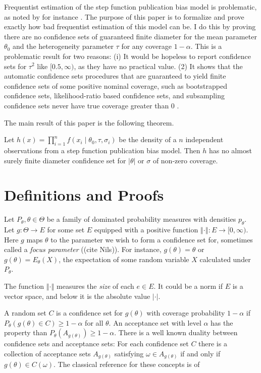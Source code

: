 \documentclass[twoside]{article}
\begin{document}
Frequentist estimation of the step function publication bias model
is problematic, as noted by for instance \citet[appendix, 1]{mcshane2016adjusting}.
The purpose of this paper is to formalize and prove exactly how bad frequentist estimation of this model can be. I do this by proving there are no confidence sets of guaranteed finite diameter for the mean parameter $\theta_{0}$
and the heterogeneity parameter $\tau$ for any coverage $1-\alpha$.
This is a problematic result for two reasons: (i) It would be hopeless
to report confidence sets for $\tau^{2}$ like $[0.5,\infty)$,
as they have no practical value. (2) It shows that the automatic confidence
sets procedures that are guaranteed to yield finite confidence sets
of some positive nominal coverage, such as bootstrapped confidence
sets, likelihood-ratio based confidence sets, and subsampling confidence
sets never have true coverage greater than $0$ \citep[see][]{gleser996bootstrap}.

The main result of this paper is the following theorem.
\begin{thm}
\label{prop:p-hacking infinite confidence interval}Let $h(x)=\prod_{i=1}^{n}f(x_{i}\mid\theta_{0},\tau,\sigma_{i})$
be the density of a $n$ independent observations from a step function
publication bias model. Then $h$ has no almost surely finite diameter
confidence set for $\left|\theta\right|$ or $\sigma$ of non-zero
coverage.
\end{thm}



\section{Definitions and Proofs}

Let $P_{\theta},\theta\in\Theta$ be a family of dominated probability
measures with densities $p_{\theta}$. Let $g:\Theta\to E$ for some
set $E$ equipped with a positive function $\left\Vert \cdot\right\Vert :E\to[0,\infty)$.
Here $g$ maps $\theta$ to the parameter we wish to form a confidence
set for, sometimes called a \textit{focus parameter} ((cite Nils)). For instance, $g(\theta) = \theta$ or $g(\theta) = E_\theta(X)$, the expectation of some random variable $X$ calculated under $P_\theta$. 

The function $\left\Vert \cdot\right\Vert$ measures the \textit{size} of each $e \in E$. It could be a norm if $E$ is a vector space, and below it is the
absolute value $\left|\cdot\right|$. 

A random set $C$ is a confidence set for $g(\theta)$ with coverage probability $1-\alpha$
if $P_{\theta}(g(\theta)\in C)\geq1-\alpha$
for all $\theta$. An\emph{ }acceptance set with level $\alpha$ has
the property than $P_{\theta}(A_{g(\theta)})\geq1-\alpha$.
There is a well known duality between confidence sets and acceptance
sets: For each confidence set $C$ there is a collection of acceptance
sets $A_{g(\theta)}$ satisfying $\omega\in A_{g(\theta)}$ if and only if $g(\theta)\in C(\omega)$. The classical reference for these concepts is of \citet[chapter 3.5]{lehmann2006testing}
\end{document}
